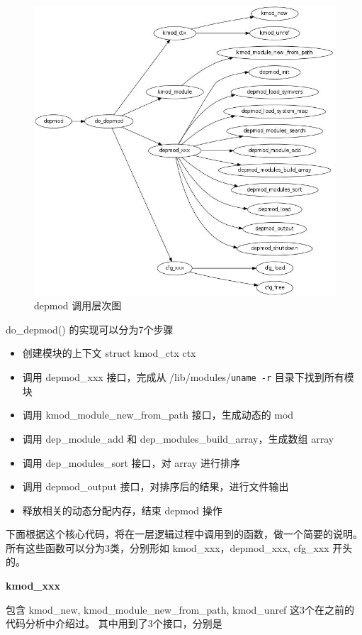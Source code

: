 \begin{figure}[htbp]
\centering
\includegraphics{./figures/depmod.jpg}
\caption{depmod 调用层次图}
\end{figure}

do\_depmod() 的实现可以分为7个步骤

\begin{itemize}
\item
  创建模块的上下文 struct kmod\_ctx ctx
\item
  调用 depmod\_xxx 接口，完成从 /lib/modules/\texttt{uname -r}
  目录下找到所有模块
\item
  调用 kmod\_module\_new\_from\_path 接口，生成动态的 mod
\item
  调用 dep\_module\_add 和 dep\_modules\_build\_array，生成数组 array
\item
  调用 dep\_modules\_sort 接口，对 array 进行排序
\item
  调用 depmod\_output 接口，对排序后的结果，进行文件输出
\item
  释放相关的动态分配内存，结束 depmod 操作
\end{itemize}
下面根据这个核心代码，将在一层逻辑过程中调用到的函数，做一个简要的说明。
所有这些函数可以分为3类，分别形如 kmod\_xxx，depmod\_xxx, cfg\_xxx
开头的。

\textbf{kmod\_xxx}

包含 kmod\_new, kmod\_module\_new\_from\_path, kmod\_unref
这3个在之前的代码分析中介绍过。 其中用到了3个接口，分别是

